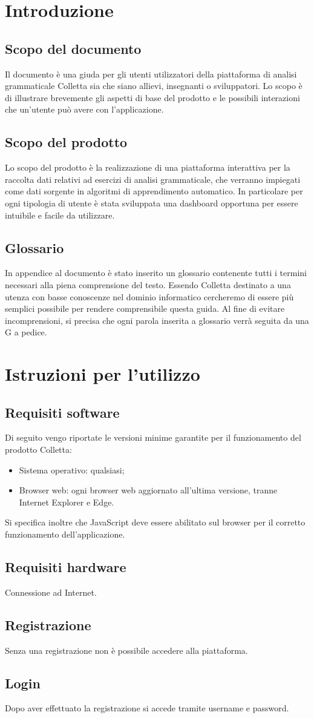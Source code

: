 \section{Introduzione}
\subsection{Scopo del documento}
Il documento è una giuda per gli utenti utilizzatori della piattaforma di analisi grammaticale Colletta sia che siano allievi, insegnanti o sviluppatori. Lo scopo è di illustrare brevemente gli aspetti di base del prodotto e le possibili interazioni che un'utente può avere con l'applicazione.
\subsection{Scopo del prodotto}
Lo scopo del prodotto è la realizzazione di una piattaforma interattiva per la raccolta dati relativi ad esercizi di analisi grammaticale, che verranno impiegati come dati sorgente in algoritmi di apprendimento automatico. In particolare per ogni tipologia di utente è stata sviluppata una dashboard opportuna per essere intuibile e facile da utilizzare.
\subsection{Glossario}
In appendice al documento \`e stato inserito un glossario contenente tutti i termini necessari alla piena comprensione del testo.  Essendo Colletta destinato a una utenza con basse conoscenze nel dominio informatico cercheremo di essere più semplici possibile per rendere comprensibile questa guida. Al fine di evitare incomprensioni, si precisa che ogni parola inserita a glossario verrà seguita da una G a pedice.

\section{Istruzioni per l'utilizzo}
\subsection{Requisiti software}
Di seguito vengo riportate le versioni minime garantite per il funzionamento del prodotto Colletta:
\begin{itemize}
\item {Sistema operativo:} qualsiasi;
\item {Browser web:} ogni browser web aggiornato all'ultima versione, tranne Internet Explorer e Edge.
\end{itemize}
Si specifica inoltre che JavaScript deve essere abilitato sul browser per il corretto funzionamento dell’applicazione.
\subsection{Requisiti hardware}
Connessione ad Internet.
\subsection{Registrazione}
Senza una registrazione non è possibile accedere alla piattaforma.
\subsection{Login}
Dopo aver effettuato la registrazione si accede tramite username e password.
